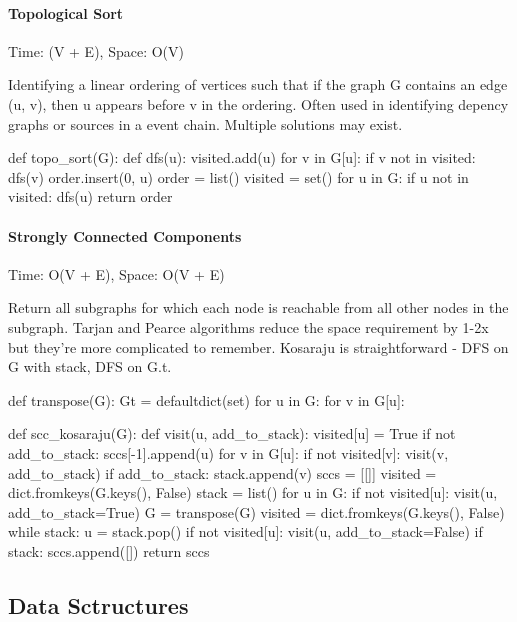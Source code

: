 \documentclass[11pt]{article}
\begin{document}
\paragraph{Topological Sort} Time: (V + E), Space: O(V)

  Identifying a linear ordering of vertices such that if the graph G contains
  an edge (u, v), then u appears before v in the ordering.  Often used in
  identifying depency graphs or sources in a event chain.  Multiple solutions
  may exist.

\begin{python}
def topo_sort(G):
    def dfs(u):
        visited.add(u)
        for v in G[u]:
            if v not in visited:
              dfs(v)
        order.insert(0, u)
    order = list()
    visited = set()
    for u in G:
        if u not in visited:
          dfs(u)
    return order
\end{python}


\paragraph{Strongly Connected Components} Time: O(V + E), Space: O(V + E)

Return all subgraphs for which each node is reachable from all other nodes in
the subgraph. Tarjan and Pearce algorithms reduce the space requirement by 1-2x
but they're more complicated to remember. Kosaraju is straightforward - DFS on
G with stack, DFS on G.t.

\begin{python}
def transpose(G):
    Gt = defaultdict(set)
    for u in G:
        for v in G[u]:

def scc_kosaraju(G):
    def visit(u, add_to_stack):
        visited[u] = True
        if not add_to_stack:
            sccs[-1].append(u)
        for v in G[u]:
            if not visited[v]:
                visit(v, add_to_stack)
        if add_to_stack:
            stack.append(v)
    sccs = [[]]
    visited = dict.fromkeys(G.keys(), False)
    stack = list()
    for u in G:
        if not visited[u]:
            visit(u, add_to_stack=True)
    G = transpose(G)
    visited = dict.fromkeys(G.keys(), False)
    while stack:
        u = stack.pop()
        if not visited[u]:
            visit(u, add_to_stack=False)
            if stack:
                sccs.append([])
    return sccs

\end{python} 


\subsection{Data Sctructures}
\end{document}
